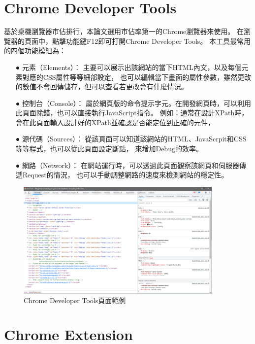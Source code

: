\section{Chrome Developer Tools}\label{s2.5}
基於桌機瀏覽器市佔排行，本論文選用市佔率第一的Chrome瀏覽器來使用。
在瀏覽器的頁面中，點擊功能鍵F12即可打開Chrome Developer Tools\cite{Chrome-Developer-Tools}。
本工具最常用的四個功能模組為：
\begin{itemize}
    \item[●] 元素（Elements）： 主要可以展示出該網站的當下HTML內文，以及每個元素對應的CSS屬性等等細部設定，
                            也可以編輯當下畫面的屬性參數，雖然更改的數值不會回傳儲存，但可以查看若更改會有什麼情況。
    \item[●] 控制台（Console）： 屬於網頁版的命令提示字元。在開發網頁時，可以利用此頁面除錯，也可以直接執行JavaScript指令。
                            例如：通常在設計XPath時，會在此頁面輸入設計好的XPath並確認是否能定位到正確的元件，
    \item[●] 源代碼（Sources）： 從該頁面可以知道該網站的HTML、JavaScrpit和CSS等等程式，也可以從此頁面設定斷點，
                            來增加Debug的效率。
    \item[●] 網路（Network）： 在網站運行時，可以透過此頁面觀察該網頁和伺服器傳遞Request的情況，
                            也可以手動調整網路的速度來檢測網站的穩定性。
\end{itemize}

\begin{figure}[H]
    \centering
    \includegraphics[width=0.9\textwidth]{picture/ch2-chromeDeveloperTool.png}
    \caption{Chrome Developer Tools頁面範例}
    \label{f2.1}
\end{figure}

\section{Chrome Extension}\label{s2.6}


